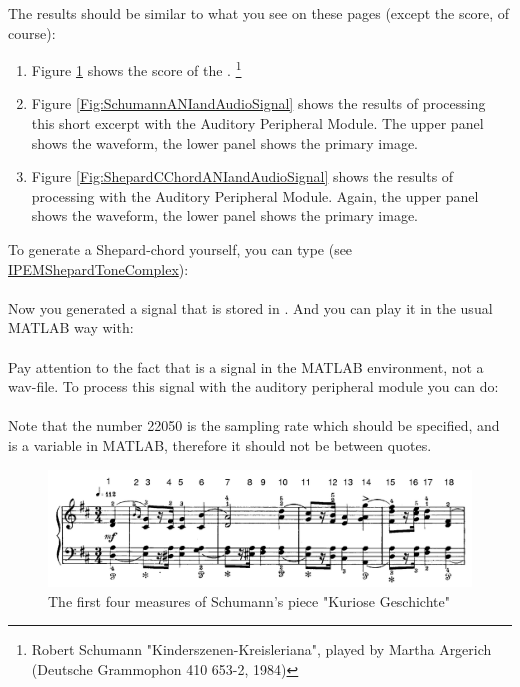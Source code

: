 The results should be similar to what you see on these pages
(except the score, of course):
\begin{enumerate}
\item
    Figure \ref{Fig:SchumannScore} shows the score of the
    .
    \footnote{Robert Schumann "Kinderszenen-Kreisleriana", played
    by Martha Argerich (Deutsche Grammophon 410 653-2, 1984)}
\item
    Figure \ref{Fig:SchumannANIandAudioSignal} shows the results of processing
    this short excerpt with the Auditory Peripheral Module. The upper panel shows
    the waveform, the lower panel shows the primary image.
\item
    Figure \ref{Fig:ShepardCChordANIandAudioSignal} shows the results of processing
     with the Auditory Peripheral Module.
    Again, the upper panel shows the waveform, the lower panel shows the primary image.
\end{enumerate}

To generate a Shepard-chord yourself, you can type (see
\hyperlink{FuncRef:IPEMShepardToneComplex}{IPEMShepardToneComplex}):\\

\\

Now you generated a signal that is stored in
. And you can play it in the usual
MATLAB way with:\\

\\

Pay attention to the fact that  is
a signal in the MATLAB environment, not a wav-file. To process
this signal with the auditory peripheral module you can do:\\

\\

Note that the number 22050 is the sampling rate which should be
specified, and  is a variable in
MATLAB, therefore it should not be between quotes.

\begin{figure}[h]
    \centering
    \includegraphics[width=\IPEMDefaultFigureWidth]{Graphics/SchumannScore}
    \caption{The first four measures of Schumann's piece "Kuriose Geschichte"}
    \label{Fig:SchumannScore}
\end{figure}

